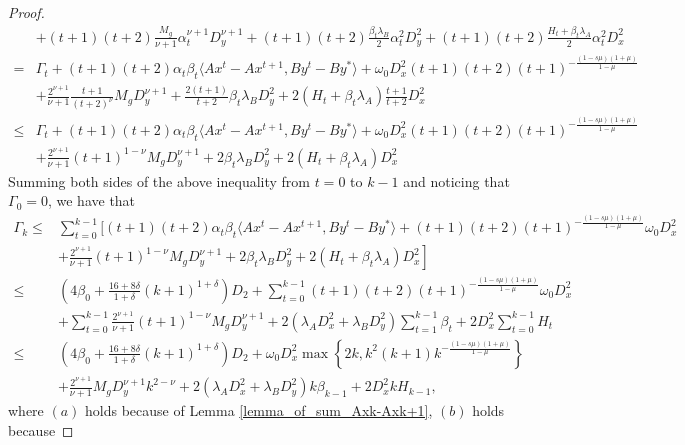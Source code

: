 \documentclass{article}
\numberwithin{equation}{section}
\begin{document}
\begin{proof}
\begin{align}
        &+ (t+1)(t+2)\frac{M_g}{\nu+1}\alpha_t^{\nu+1}D_y^{\nu+1}+(t+1)(t+2)\frac{\beta_t\lambda_B}{2}\alpha_t^2D_y^2 + (t+1)(t+2)\frac{H_t+\beta_t\lambda_A}{2}\alpha_t^2D_x^2\nonumber \\
        =&\Gamma_t+(t+1)(t+2)\alpha_t\beta_t\langle Ax^t-Ax^{t+1}, By^t-By^*\rangle +\omega_0D_x^2(t+1)(t+2) (t+1)^{-\frac{(1-s\mu)(1+\mu)}{1-\mu}} \nonumber \\
        &+\frac{2^{\nu+1}}{\nu+1}\frac{t+1}{(t+2)^{\nu}}M_gD_y^{\nu+1} +\frac{2(t+1)}{t+2}\beta_t\lambda_BD_y^2 +2(H_t+\beta_t\lambda_A)\frac{t+1}{t+2}D_x^2 \nonumber \\
        \leq &\Gamma_t+(t+1)(t+2)\alpha_t\beta_t\langle Ax^t-Ax^{t+1}, By^t-By^*\rangle +\omega_0D_x^2(t+1)(t+2) (t+1)^{-\frac{(1-s\mu)(1+\mu)}{1-\mu}} \nonumber \\
        &+\frac{2^{\nu+1}}{\nu+1}(t+1)^{1-\nu}M_gD_y^{\nu+1} +2\beta_t\lambda_BD_y^2 +2(H_t+\beta_t\lambda_A)D_x^2 \nonumber
    \end{align}
    Summing both sides of the above inequality from $t=0$ to $k-1$ and noticing that $\Gamma_0 =0$, we have that
    \begin{align}
        \Gamma_k \leq& \sum\limits_{t=0}^{k-1} \Big[(t+1)(t+2)\alpha_t\beta_t\langle Ax^t-Ax^{t+1}, By^t-By^*\rangle +(t+1)(t+2) (t+1)^{-\frac{(1-s\mu)(1+\mu)}{1-\mu}}\omega_0D_x^2  \nonumber \\
        &\left.+\frac{2^{\nu+1}}{\nu+1}(t+1)^{1-\nu}M_gD_y^{\nu+1} +2\beta_t\lambda_BD_y^2 +2(H_t+\beta_t\lambda_A)D_x^2  \right] \nonumber  \\
        \overset{\mathop{(a)}}{\leq} & \left(4\beta_0+\frac{16+8\delta}{1+\delta}(k+1)^{1+\delta}\right)D_2 +\sum\limits_{t=0}^{k-1}(t+1)(t+2)(t+1)^{-\frac{(1-s\mu)(1+\mu)}{1-\mu}}\omega_0D_x^2 \nonumber \\
        &+\sum\limits_{t=0}^{k-1}\frac{2^{\nu+1}}{\nu+1}(t+1)^{1-\nu}M_gD_y^{\nu+1} +2(\lambda_AD_x^2+ \lambda_BD_y^2)\sum\limits_{t=1}^{k-1} \beta_t
        +2D_x^2\sum\limits_{t=0}^{k-1}H_t              \nonumber \\
        \overset{\mathop{(b)}}{\leq} & \left(4\beta_0+\frac{16+8\delta}{1+\delta}(k+1)^{1+\delta}\right)D_2+\omega_0D_x^2 \max\left\{ 2k, k^2(k+1)k^{-\frac{(1-s\mu)(1+\mu)}{1-\mu}} \right\} \nonumber \\
        & + \frac{2^{\nu+1}}{\nu+1}M_gD_y^{\nu+1}k^{2-\nu} +2(\lambda_AD_x^2+ \lambda_BD_y^2)k\beta_{k-1} +2D_x^2kH_{k-1}, \nonumber 
    \end{align}
    where $(a)$ holds because of Lemma \ref{lemma_of_sum_Axk-Axk+1}, $(b)$ holds because 

\end{proof}
\end{document}
